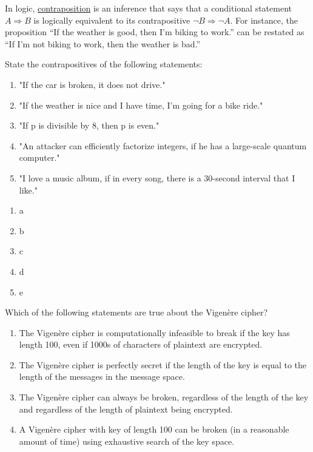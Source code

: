 \documentclass[a4paper,10pt]{article}
\begin{document}
\begin{question}{5}
In logic, \href{https://en.wikipedia.org/wiki/Contraposition}{contraposition} is an inference that says that a conditional statement $A \Rightarrow B$  is logically equivalent to its contrapositive  $\neg B \Rightarrow \neg A$.
For instance, the proposition ``If the weather is good, then I'm biking to work.'' can be restated as ``If I'm not biking to work, then the weather is bad.''

State the contrapositives of the following statements:
\begin{enumerate}
\item "If the car is broken, it does not drive."
\item "If the weather is nice and I have time, I'm going for a bike ride."
\item "If p is divisible by 8, then p is even."
\item "An attacker can efficiently factorize integers, if he has a large-scale quantum computer."
\item "I love a music album, if in every song, there is a 30-second interval that I like."
\end{enumerate}
\end{question}

\begin{solution}
\begin{enumerate}
\item a
\item b
\item c
\item d
\item e
\end{enumerate}
\end{solution}

\begin{question}{2}
  Which of the following statements are true about the Vigenère cipher?

  \begin{enumerate}
  \item  The Vigenère cipher is computationally infeasible to break if the key has length 100, even if 1000s of characters of plaintext are encrypted.
 \item The Vigenère cipher is perfectly secret if the length of the key is equal to the length of the messages in the message space.
\item The Vigenère cipher can always be broken, regardless of the length of the key and regardless of the length of plaintext being encrypted.
\item A Vigenère cipher with key of length 100 can be broken (in a reasonable amount of time) using exhaustive search of the key space.
\end{enumerate}

\end{question}
\begin{solution}
\end{solution}
\end{document}
